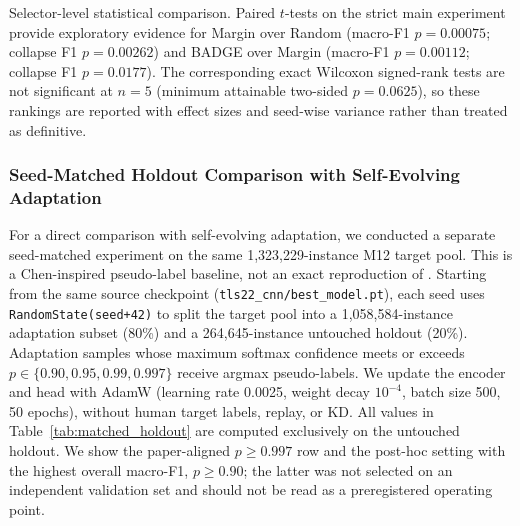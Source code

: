 \documentclass[preprint,12pt,authoryear]{elsarticle}
\begin{document}
Selector-level statistical comparison.
\label{sec:significance}
Paired $t$-tests on the strict main experiment provide exploratory evidence for Margin over Random (macro-F1 $p{=}0.00075$; collapse F1 $p{=}0.00262$) and BADGE over Margin (macro-F1 $p{=}0.00112$; collapse F1 $p{=}0.0177$).
The corresponding exact Wilcoxon signed-rank tests are not significant at $n{=}5$ (minimum attainable two-sided $p{=}0.0625$), so these rankings are reported with effect sizes and seed-wise variance rather than treated as definitive.

\subsubsection{Seed-Matched Holdout Comparison with Self-Evolving Adaptation}
\label{sec:matched_holdout}

For a direct comparison with self-evolving adaptation, we conducted a separate seed-matched experiment on the same 1{,}323{,}229-instance M12 target pool. This is a Chen-inspired pseudo-label baseline, not an exact reproduction of \citet{chen2025selfevolving}.
Starting from the same source checkpoint (\texttt{tls22\_cnn/best\_model.pt}), each seed uses \texttt{RandomState(seed+42)} to split the target pool into a 1{,}058{,}584-instance adaptation subset (80\%) and a 264{,}645-instance untouched holdout (20\%). Adaptation samples whose maximum softmax confidence meets or exceeds $p\in\{0.90,0.95,0.99,0.997\}$ receive argmax pseudo-labels. We update the encoder and head with AdamW (learning rate 0.0025, weight decay $10^{-4}$, batch size 500, 50 epochs), without human target labels, replay, or KD.
All values in Table~\ref{tab:matched_holdout} are computed exclusively on the untouched holdout. We show the paper-aligned $p{\geq}0.997$ row and the post-hoc setting with the highest overall macro-F1, $p{\geq}0.90$; the latter was not selected on an independent validation set and should not be read as a preregistered operating point.
\end{document}

